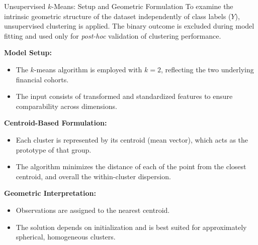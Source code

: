 \documentclass[8pt, aspectratio=169]{beamer}
\begin{document}
\begin{frame}{Unsupervised $k$-Means: Setup and Geometric Formulation}
\small
To examine the intrinsic geometric structure of the dataset independently of class labels ($Y$), unsupervised clustering is applied. The binary outcome is excluded during model fitting and used only for \textit{post-hoc} validation of clustering performance.

\vspace{0.5em}
\textbf{Model Setup:}
\begin{itemize}
    \item The $k$-means algorithm is employed with $k = 2$, reflecting the two underlying financial cohorts.
    \item The input consists of transformed and standardized features to ensure comparability across dimensions.
\end{itemize}

\vspace{0.5em}
\textbf{Centroid-Based Formulation:}
\begin{itemize}
    \item Each cluster is represented by its centroid (mean vector), which acts as the prototype of that group.
    \item The algorithm minimizes the distance of each of the point from the closest centroid, and overall the within-cluster dispersion.
\end{itemize}

\vspace{0.5em}
\textbf{Geometric Interpretation:}
\begin{itemize}
    \item Observations are assigned to the nearest centroid.
    \item The solution depends on initialization and is best suited for approximately spherical, homogeneous clusters.
\end{itemize}
\end{frame}
\end{document}
